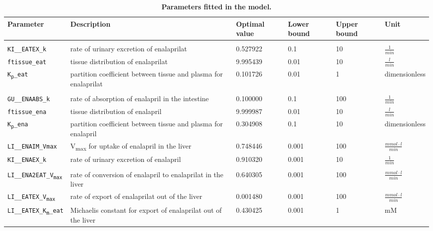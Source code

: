 \documentclass[pharmaceutics,article,submit,pdftex,moreauthors]{Definitions/mdpi}
\begin{document}
\begin{table}[htbp]
\centering
\small
\caption[Fitted model parameters]{\textbf{Parameters fitted in the model.}}
\label{tab:Parameter_Fitting}
\vspace{0.1cm}
\begin{tabular}{L{0.17\textwidth} L{0.257\textwidth} P{0.100\textwidth} P{0.075\textwidth} P{0.075\textwidth} P{0.140\textwidth}}
 \toprule
\textbf{Parameter} & \textbf{Description} & \textbf{Optimal value} & \textbf{Lower bound} & \textbf{Upper bound}& \textbf{Unit}\\
\hline
{}
\\
\hline
\texttt{KI\_\_EATEX\_k} & rate of urinary excretion of enalaprilat & 0.527922 & 0.1 & 10 & $\frac{1}{min}$ \newline \\
\texttt{ftissue\_eat} & tissue distribution of enalaprilat & 9.995439 & 0.01 & 10  & $\frac{l}{min}$ \newline \\
\texttt{K\textsubscript{p}\_eat} & partition coefficient between tissue and plasma for enalaprilat & 0.101726 & 0.01 & 1  & dimensionless \newline \\
\hline
{}
\\
\hline
\texttt{GU\_\_ENAABS\_k} & rate of absorption of enalapril in the intestine & 0.100000 & 0.1 & 100 & $\frac{1}{min}$ \\
\texttt{ftissue\_ena} & tissue distribution of enalapril & 9.999987 & 0.01 & 10 & $\frac{l}{min}$ \\
\texttt{K\textsubscript{p}\_ena} & partition coefficient between tissue and plasma for enalapril & 0.304908 & 0.1 & 10 & dimensionless \\
\texttt{LI\_\_ENAIM\_Vmax} & V\textsubscript{max} for uptake of enalapril in the liver & 0.748446 & 0.001 & 100 & $\frac{mmol\cdot l}{min}$ \\
\texttt{KI\_\_ENAEX\_k} & rate of urinary excretion of enalapril & 0.910320 & 0.001 & 10 & $\frac{1}{min}$ \\
\hline
{}
\\
\hline
\texttt{LI\_\_\allowbreak ENA2EAT\_\allowbreak V\textsubscript{max}} & rate of conversion of enalapril to enalaprilat in the liver & 0.640305 & 0.001 & 100 & $\frac{mmol\cdot l}{min}$ \\
\texttt{LI\_\_EATEX\_V\textsubscript{max}} & rate of export of enalaprilat out of the liver & 0.001480 & 0.001 & 100 & $\frac{mmol\cdot l}{min}$ \\
\texttt{LI\_\_\allowbreak EATEX\_\allowbreak K\textsubscript{m}\_\allowbreak eat} & Michaelis constant for export of enalaprilat out of the liver & 0.430425 & 0.001 & 1 & mM \\
 \bottomrule
\end{tabular}
\end{table}
\end{document}
